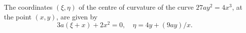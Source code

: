The coordinates $(\xi, \eta)$ of the centre of curvature of the curve
$27ay^{2} = 4x^{3}$, at the point $(x, y)$, are given by
\[
3a(\xi + x) + 2x^{2} = 0, \quad
\eta = 4y + (9ay)/x.\quad
\]


